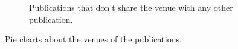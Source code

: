\begin{figure}
\begin{subfigure}[t]{0.41\textwidth}
    \caption{Publications that don't share the venue with any other publication.}
    \label{fig:pubs_venue_alone}
  \end{subfigure}
  \caption{Pie charts about the venues of the publications.}
\end{figure}
